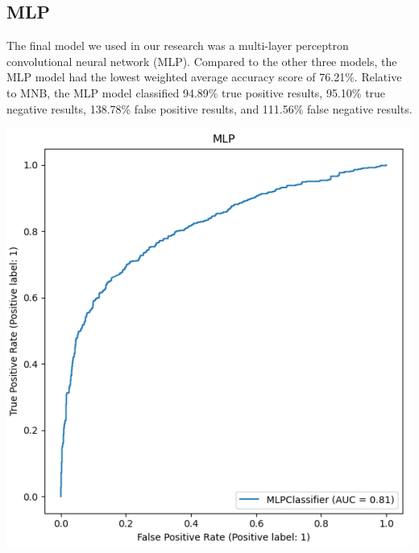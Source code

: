 \documentclass[11pt]{diazessay} %
\begin{document}
\subsection{MLP}

The final model we used in our research was a multi-layer perceptron convolutional neural network (MLP). Compared to the other three models, the MLP model had the lowest weighted average accuracy score of 76.21\%. Relative to MNB, the MLP model classified 94.89\% true positive results, 95.10\% true negative results, 138.78\% false positive results, and 111.56\% false negative results.

\begin{minipage}[t]{.45\linewidth}
\includegraphics[width=\linewidth]{images/mlp_plot.png}
\end{minipage}\hfill
\end{document}
